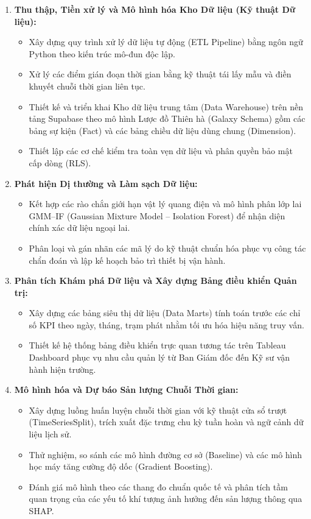\documentclass[12pt, a4paper]{report}
\begin{document}
\begin{enumerate}[label=\arabic*., leftmargin=*]
    \item \textbf{Thu thập, Tiền xử lý và Mô hình hóa Kho Dữ liệu (Kỹ thuật Dữ liệu):}
    \begin{itemize}[noitemsep]
        \item Xây dựng quy trình xử lý dữ liệu tự động (ETL Pipeline) bằng ngôn ngữ Python theo kiến trúc mô-đun độc lập.
        \item Xử lý các điểm gián đoạn thời gian bằng kỹ thuật tái lấy mẫu và điền khuyết chuỗi thời gian liên tục.
        \item Thiết kế và triển khai Kho dữ liệu trung tâm (Data Warehouse) trên nền tảng Supabase theo mô hình Lược đồ Thiên hà (Galaxy Schema) gồm các bảng sự kiện (Fact) và các bảng chiều dữ liệu dùng chung (Dimension).
        \item Thiết lập các cơ chế kiểm tra toàn vẹn dữ liệu và phân quyền bảo mật cấp dòng (RLS).
    \end{itemize}
    \item \textbf{Phát hiện Dị thường và Làm sạch Dữ liệu:}
    \begin{itemize}[noitemsep]
        \item Kết hợp các rào chắn giới hạn vật lý quang điện và mô hình phân lớp lai GMM--IF (Gaussian Mixture Model -- Isolation Forest) để nhận diện chính xác dữ liệu ngoại lai.
        \item Phân loại và gán nhãn các mã lý do kỹ thuật chuẩn hóa phục vụ công tác chẩn đoán và lập kế hoạch bảo trì thiết bị vận hành.
    \end{itemize}
    \item \textbf{Phân tích Khám phá Dữ liệu và Xây dựng Bảng điều khiển Quản trị:}
    \begin{itemize}[noitemsep]
        \item Xây dựng các bảng siêu thị dữ liệu (Data Marts) tính toán trước các chỉ số KPI theo ngày, tháng, trạm phát nhằm tối ưu hóa hiệu năng truy vấn.
        \item Thiết kế hệ thống bảng điều khiển trực quan tương tác trên Tableau Dashboard phục vụ nhu cầu quản lý từ Ban Giám đốc đến Kỹ sư vận hành hiện trường.
    \end{itemize}
    \item \textbf{Mô hình hóa và Dự báo Sản lượng Chuỗi Thời gian:}
    \begin{itemize}[noitemsep]
        \item Xây dựng luồng huấn luyện chuỗi thời gian với kỹ thuật cửa sổ trượt (TimeSeriesSplit), trích xuất đặc trưng chu kỳ tuần hoàn và ngữ cảnh dữ liệu lịch sử.
        \item Thử nghiệm, so sánh các mô hình đường cơ sở (Baseline) và các mô hình học máy tăng cường độ dốc (Gradient Boosting).
        \item Đánh giá mô hình theo các thang đo chuẩn quốc tế và phân tích tầm quan trọng của các yếu tố khí tượng ảnh hưởng đến sản lượng thông qua SHAP.
    \end{itemize}
\end{enumerate}
\end{document}
